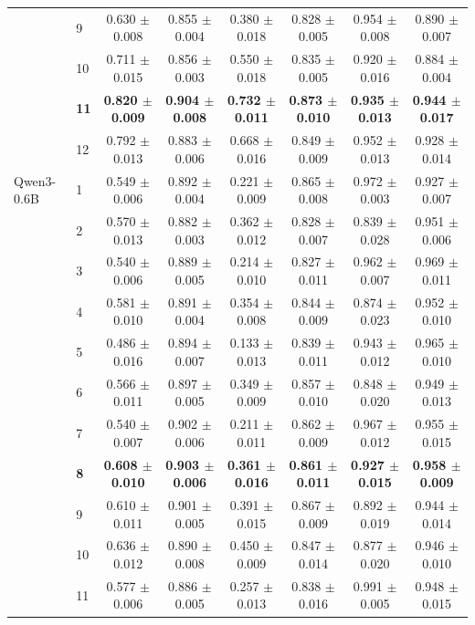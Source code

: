 \begin{longtable}{llcccccc}
 & 9 & 0.630 $\pm$ 0.008 & 0.855 $\pm$ 0.004 & 0.380 $\pm$ 0.018 & 0.828 $\pm$ 0.005 & 0.954 $\pm$ 0.008 & 0.890 $\pm$ 0.007 \\
 & 10 & 0.711 $\pm$ 0.015 & 0.856 $\pm$ 0.003 & 0.550 $\pm$ 0.018 & 0.835 $\pm$ 0.005 & 0.920 $\pm$ 0.016 & 0.884 $\pm$ 0.004 \\
 & \textbf{11} & \textbf{0.820 $\pm$ 0.009} & \textbf{0.904 $\pm$ 0.008} & \textbf{0.732 $\pm$ 0.011} & \textbf{0.873 $\pm$ 0.010} & \textbf{0.935 $\pm$ 0.013} & \textbf{0.944 $\pm$ 0.017} \\
 & 12 & 0.792 $\pm$ 0.013 & 0.883 $\pm$ 0.006 & 0.668 $\pm$ 0.016 & 0.849 $\pm$ 0.009 & 0.952 $\pm$ 0.013 & 0.928 $\pm$ 0.014 \\
\midrule
Qwen3-0.6B & 1 & 0.549 $\pm$ 0.006 & 0.892 $\pm$ 0.004 & 0.221 $\pm$ 0.009 & 0.865 $\pm$ 0.008 & 0.972 $\pm$ 0.003 & 0.927 $\pm$ 0.007 \\
 & 2 & 0.570 $\pm$ 0.013 & 0.882 $\pm$ 0.003 & 0.362 $\pm$ 0.012 & 0.828 $\pm$ 0.007 & 0.839 $\pm$ 0.028 & 0.951 $\pm$ 0.006 \\
 & 3 & 0.540 $\pm$ 0.006 & 0.889 $\pm$ 0.005 & 0.214 $\pm$ 0.010 & 0.827 $\pm$ 0.011 & 0.962 $\pm$ 0.007 & 0.969 $\pm$ 0.011 \\
 & 4 & 0.581 $\pm$ 0.010 & 0.891 $\pm$ 0.004 & 0.354 $\pm$ 0.008 & 0.844 $\pm$ 0.009 & 0.874 $\pm$ 0.023 & 0.952 $\pm$ 0.010 \\
 & 5 & 0.486 $\pm$ 0.016 & 0.894 $\pm$ 0.007 & 0.133 $\pm$ 0.013 & 0.839 $\pm$ 0.011 & 0.943 $\pm$ 0.012 & 0.965 $\pm$ 0.010 \\
 & 6 & 0.566 $\pm$ 0.011 & 0.897 $\pm$ 0.005 & 0.349 $\pm$ 0.009 & 0.857 $\pm$ 0.010 & 0.848 $\pm$ 0.020 & 0.949 $\pm$ 0.013 \\
 & 7 & 0.540 $\pm$ 0.007 & 0.902 $\pm$ 0.006 & 0.211 $\pm$ 0.011 & 0.862 $\pm$ 0.009 & 0.967 $\pm$ 0.012 & 0.955 $\pm$ 0.015 \\
 & \textbf{8} & \textbf{0.608 $\pm$ 0.010} & \textbf{0.903 $\pm$ 0.006} & \textbf{0.361 $\pm$ 0.016} & \textbf{0.861 $\pm$ 0.011} & \textbf{0.927 $\pm$ 0.015} & \textbf{0.958 $\pm$ 0.009} \\
 & 9 & 0.610 $\pm$ 0.011 & 0.901 $\pm$ 0.005 & 0.391 $\pm$ 0.015 & 0.867 $\pm$ 0.009 & 0.892 $\pm$ 0.019 & 0.944 $\pm$ 0.014 \\
 & 10 & 0.636 $\pm$ 0.012 & 0.890 $\pm$ 0.008 & 0.450 $\pm$ 0.009 & 0.847 $\pm$ 0.014 & 0.877 $\pm$ 0.020 & 0.946 $\pm$ 0.010 \\
 & 11 & 0.577 $\pm$ 0.006 & 0.886 $\pm$ 0.005 & 0.257 $\pm$ 0.013 & 0.838 $\pm$ 0.016 & 0.991 $\pm$ 0.005 & 0.948 $\pm$ 0.015 \\

\end{longtable}
